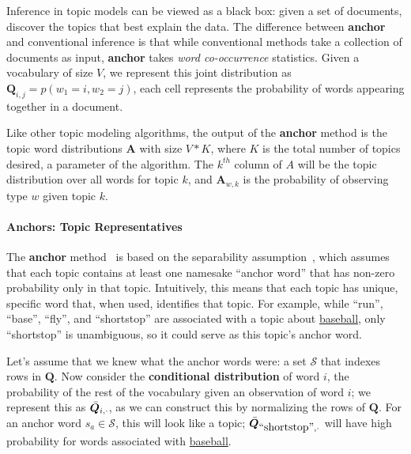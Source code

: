 Inference in topic models can be viewed as a black box: given a set of
documents, discover the topics that best explain the data.  The difference
between {\bf anchor} and conventional inference is that while
conventional methods take a collection of documents as input, {\bf anchor}
takes \emph{word co-occurrence} statistics.  Given a vocabulary of size
$V$, we represent this joint distribution as $\bm{Q}_{i,j} = p(w_1 =i, w_2=j)$,
each cell represents the probability of words appearing together in a document.

Like other topic modeling algorithms, the output of the {\bf anchor} method is
the topic word distributions $\bm{A}$ with size $V*K$, where $K$ is the total number
of topics desired, a parameter of the algorithm.  The $k^{th}$ column of $A$
will be the topic distribution over all words for topic $k$, and $\bm{A}_{w,k}$ is
the probability of observing type $w$ given topic $k$.

\paragraph{Anchors: Topic Representatives}

The {\bf anchor} method~\cite{Arora-2012} is based on the separability
assumption~\cite{Donoho-2003}, which assumes that each topic contains at least
one namesake ``anchor word'' that has non-zero probability only in that topic.
Intuitively, this means that each topic has unique, specific word that, when
used, identifies that topic.  For example, while ``run'', ``base'', ``fly'', and
``shortstop'' are associated with a topic about \underline{baseball},
only ``shortstop'' is unambiguous, so it could serve as this topic's anchor word.

Let's assume that we knew what the anchor words were: a set $\mathcal{S}$ that
indexes rows in $\bm{Q}$.  Now consider the {\bf conditional distribution} of word
$i$, the probability of the rest of the vocabulary given an observation of word
$i$; we represent this as $\bar{\bm{Q}}_{i, \cdot}$, as we can construct this by
normalizing the rows of $\bm{Q}$.  For an anchor word $s_a \in
\mathcal{S}$, this will look like a topic; $\bar{\bm{Q}}_{\mbox{``shortstop''}, \cdot}$ will have
high probability for words associated with \underline{baseball}.

